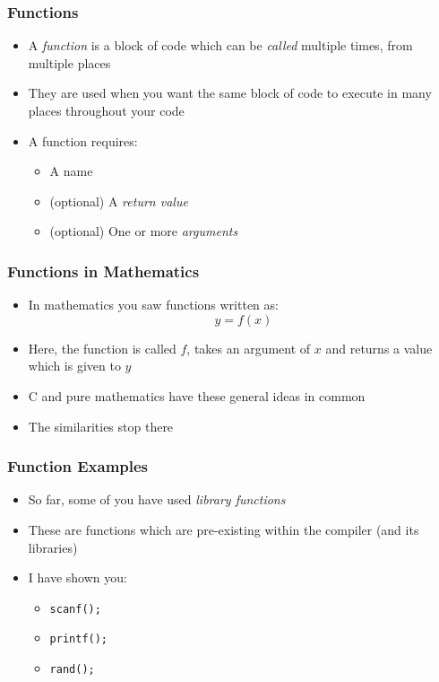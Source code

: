 \documentclass[14pt]{beamer}
\begin{document}
\begin{frame}
\frametitle{Functions}
\begin{itemize}
\item A \textit{function} is a block of code which can be \textit{called} multiple times, from multiple places
\item They are used when you want the same block of code to execute in many places throughout your code
\item A function requires:
	\begin{itemize}
		\item A name
		\item (optional) A \textit{return value}
		\item (optional) One or more \textit{arguments}
	\end{itemize}
\end{itemize}
\end{frame}

\begin{frame}
\frametitle{Functions in Mathematics}
\begin{itemize}
\item In mathematics you saw functions written as:
\begin{equation*}
y = f(x)
\end{equation*}
\item Here, the function is called $f$, takes an argument of $x$ and returns a value which is given to $y$
\item C and pure mathematics have these general ideas in common
\pause
\item The similarities stop there
\end{itemize}
\end{frame}

\begin{frame}
\frametitle{Function Examples}
\begin{itemize}
\item So far, some of you have used \textit{library functions}
\item These are functions which are pre-existing within the compiler (and its libraries)
\item I have shown you:
	\begin{itemize}
		\item \texttt{scanf();}
		\item \texttt{printf();}
		\item \texttt{rand();}
	\end{itemize}
\end{itemize}
\end{frame}
\end{document}

